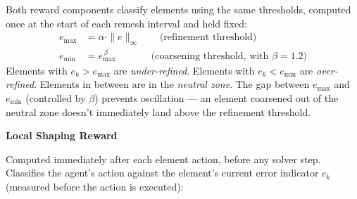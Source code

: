 \documentclass[11pt]{article}
\begin{document}
\vspace{0.15cm}
\noindent Both reward components classify elements using the same thresholds, computed once at the start of each remesh interval and held fixed:
\begin{align}
e_{\max} &= \alpha \cdot \|e\|_\infty \qquad \text{(refinement threshold)} \\
e_{\min} &= e_{\max}^{\,\beta} \qquad\quad\;\; \text{(coarsening threshold, with } \beta = 1.2 \text{)}
\end{align}
Elements with $e_k > e_{\max}$ are \textit{under-refined}. Elements with $e_k < e_{\min}$ are \textit{over-refined}. Elements in between are in the \textit{neutral zone}. The gap between $e_{\max}$ and $e_{\min}$ (controlled by $\beta$) prevents oscillation --- an element coarsened out of the neutral zone doesn't immediately land above the refinement threshold.

\vspace{0.5cm}
\noindent\textbf{\textcolor{solvercolor}{Local Shaping Reward}}

\vspace{0.15cm}
\noindent Computed immediately after each element action, before any solver step. Classifies the agent's action against the element's current error indicator $e_k$ (measured before the action is executed):
\end{document}
